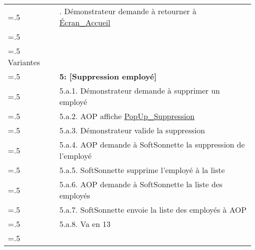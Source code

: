 \begin{table}[H]
\begin{tabularx}{\textwidth}{|>{\hsize=.5\hsize}X|>{\hsize=1.5\hsize}X|}
    &    14. Démonstrateur demande à retourner à \hyperlink{EcranAccueil}{Écran\_Accueil} \\
    & \\
    \hline
    Variantes & \\
    & \textbf{5: [Suppression employé]} \\
    & 5.a.1. Démonstrateur demande à supprimer un employé \\
    & 5.a.2. AOP affiche \hyperlink{popUpSuppression}{PopUp\_Suppression} \\
    & 5.a.3. Démonstrateur valide la suppression \\
    & 5.a.4. AOP demande à SoftSonnette la suppression de l'employé \\
    & 5.a.5. SoftSonnette supprime l'employé à la liste \\
    & 5.a.6. AOP demande à SoftSonnette la liste des employés \\
    & 5.a.7. SoftSonnette envoie la liste des employés à AOP \\
    & 5.a.8. Va en 13 \\
    & \\
    \hline
  \end{tabularx}
  \label{tableau-cu-modifier-liste-employes}
\end{table}

